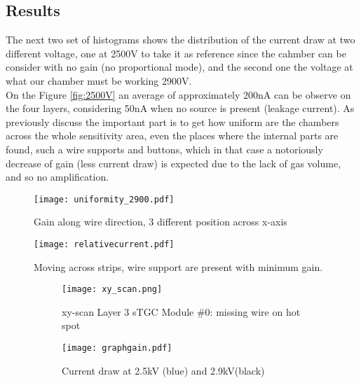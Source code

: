 \subsection{Results}
The next two set of histograms shows the distribution of the current draw at two different voltage, one at 2500V to take
it as  reference since the cahmber can be consider with no gain (no proportional mode), and the second one the voltage
at what our chamber must be working 2900V.\\ On the Figure \ref{fig:2500V} an average of approximately \unit{200}{nA}
can be observe on the four layers, considering \unit{50}{nA} when no source is present (leakage current).  As previously
discuss the important part is to get how uniform are the chambers across the whole sensitivity area, even the places
where the internal parts are found, such a wire supports and buttons, which in that case a notoriously decrease of gain
(less current draw) is expected due to the lack of gas volume, and so no amplification.\\

\begin{figure}[ht]
	\centering
	\texttt{[image: uniformity\_2900.pdf]}
	\caption{Gain along wire direction, 3 different position across x-axis}\label{}
\end{figure}

\begin{figure}[ht]
	\centering
	\texttt{[image: relativecurrent.pdf]}
	\caption{Moving across strips, wire support are present with minimum gain.}\label{}
\end{figure}

\begin{figure}[ht]
		\centering
		\hspace*{\fill}
		\begin{subfigure}[b]{0.45\textwidth}
			\centering
			\texttt{[image: xy\_scan.png]}
			\caption{xy-scan Layer 3 sTGC Module \#0: missing wire on hot spot}\label{fig:}
		\end{subfigure}
		\hfill
		\begin{subfigure}[b]{0.45\textwidth}
			\centering
			\texttt{[image: graphgain.pdf]}
			\caption{Current draw at 2.5kV (blue) and 2.9kV(black)}\label{fig:draw}
		\end{subfigure}
		\hspace*{\fill}
		\caption{}\label{}
\end{figure}




